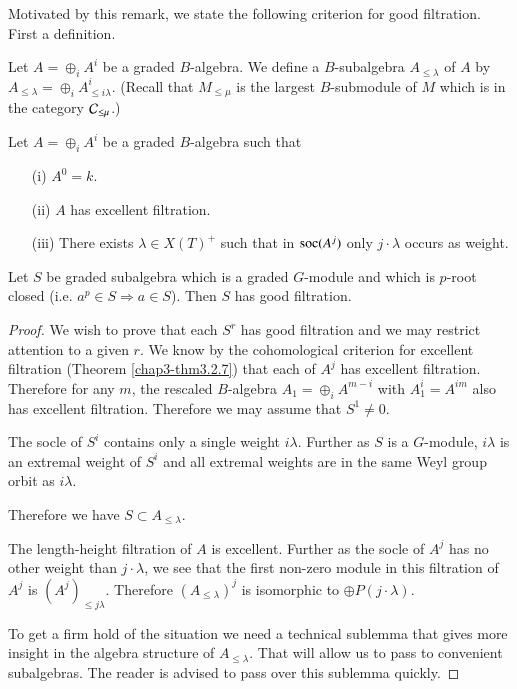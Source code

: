 Motivated by this remark, we state the following criterion for good
filtration. First a definition.

\begin{definition}\label{chap4-defi4.2.2}
Let $A=\oplus_{i}A^{i}$ be a graded $B$-algebra. We define a
$B$-subalgebra $A_{\leq \lambda}$ of $A$ by
$A_{\leq\lambda}=\oplus_{i}A^{i}_{\leq i\lambda}$. (Recall that
$M_{\leq \mu}$ is the largest $B$-submodule of $M$ which is in the
category $\mathcal{C}_{\leq \mu}$.)
\end{definition}

\begin{theorem}\label{chap4-thm4.2.3}
Let $A=\oplus_{i}A^{i}$ be a graded $B$-algebra such that 
\begin{itemize}
\item[\rm(i)] $A^{0}=k$.\pageoriginale

\item[\rm(ii)] $A$\label{page36} has excellent filtration.

\item[\rm(iii)] There exists $\lambda\in X(T)^{+}$ such that in
  $\operatorname{soc}(A^{j})$ only $j\cdot\lambda$ occurs as weight.
\end{itemize}

Let $S$ be graded subalgebra which is a graded $G$-module and which is
$p$-root closed (i.e. $a^{p}\in S\Rightarrow a\in S$). Then $S$ has
good filtration.
\end{theorem}

\begin{proof}
We wish to prove that each $S^{r}$ has good filtration and we may
restrict attention to a given $r$. We know by the cohomological
criterion for excellent filtration (Theorem \ref{chap3-thm3.2.7}) that
each of $A^{j}$ has excellent filtration. Therefore for any $m$, the
rescaled $B$-algebra $A_{1}=\oplus_{i}A^{m-i}$ with $A^{i}_{1}=A^{im}$
also has excellent filtration. Therefore we may assume that $S^{1}\neq
0$.

The socle of $S^{i}$ contains only a single weight $i\lambda$. Further
as $S$ is a $G$-module, $i\lambda$ is an extremal weight of $S^{i}$
and all extremal weights are in the same Weyl group orbit as
$i\lambda$.

Therefore we have $S\subset A_{\leq \lambda}$.

The length-height filtration of $A$ is excellent. Further as the socle
of $A^{j}$ has no other weight than $j\cdot\lambda$, we see that the
first non-zero module in this filtration of $A^{j}$ is $(A^{j})_{\leq
  j\lambda}$. Therefore $(A_{\leq \lambda})^{j}$ is isomorphic to
$\oplus P(j\cdot \lambda)$.

To get a firm hold of the situation we need a technical sublemma that
gives more insight in the algebra structure of $A_{\leq
  \lambda}$. That will allow us to pass to convenient subalgebras. The
reader is advised to pass over this sublemma quickly.
\end{proof}

